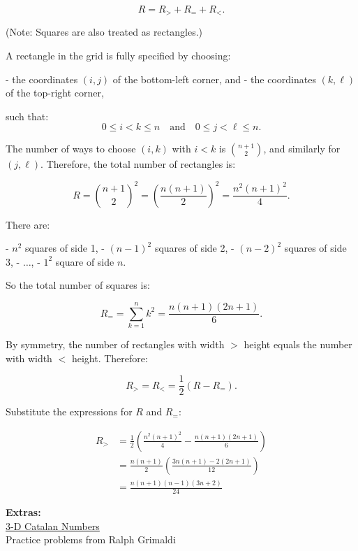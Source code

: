 \documentclass{article}
\begin{document}
\[
R = R_{>} + R_{=} + R_{<}.
\]

(Note: Squares are also treated as rectangles.)

A rectangle in the grid is fully specified by choosing:

- the coordinates $(i, j)$ of the bottom-left corner, and  
- the coordinates $(k, \ell)$ of the top-right corner,

such that:
\[
0 \leq i < k \leq n \quad \text{and} \quad 0 \leq j < \ell \leq n.
\]

The number of ways to choose $(i, k)$ with $i < k$ is $\binom{n+1}{2}$, and similarly for $(j, \ell)$. Therefore, the total number of rectangles is:

\[
R = \binom{n+1}{2}^2 = \left( \frac{n(n+1)}{2} \right)^2 = \frac{n^2(n+1)^2}{4}.
\]


There are:

- $n^2$ squares of side 1,  
- $(n-1)^2$ squares of side 2,  
- $(n-2)^2$ squares of side 3,  
- $\dots$,  
- $1^2$ square of side $n$.

So the total number of squares is:

\[
R_{=} = \sum_{k=1}^{n} k^2 = \frac{n(n+1)(2n+1)}{6}.
\]


By symmetry, the number of rectangles with width $>$ height equals the number with width $<$ height. Therefore:

\[
R_{>} = R_{<} = \frac{1}{2}(R - R_{=}).
\]

Substitute the expressions for $R$ and $R_{=}$:

\begin{align*}
R_{>} &= \frac{1}{2} \left( \frac{n^2(n+1)^2}{4} - \frac{n(n+1)(2n+1)}{6} \right) \\
&= \frac{n(n+1)}{2} \left( \frac{3n(n+1) - 2(2n+1)}{12} \right) \\
&= \frac{n(n+1)(n-1)(3n+2)}{24}
\end{align*}

\vspace{0.5cm}
\noindent
\textbf{Extras:}\\
\href{https://www.mat.univie.ac.at/~slc/wpapers/FPSAC2017/39%20Borie.pdf}{3-D Catalan Numbers}\\
Practice problems from Ralph Grimaldi
\end{document}
